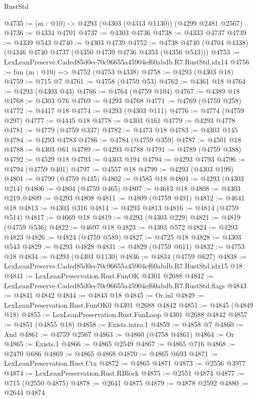 \begin{lexlean}{RustStd}
\begin{coremodule}
@4735 := (m : @10) -> @4293 (@4303 (@4313 @1130)) (@4299 @2481 @2567)
@4736 := @4334 @4701
@4737 := @4303 @4736
@4738 := @4333 @4737
@4739 := @4339 @543
@4740 := @4303 @4739
@4752 := @4738 @4740 (@4704 @4338) (@4346 @4740 @4737 (@4350 @4739 @4736 @4353 (@4356 @543)))
@4753 := LexLeanPreserve.Caded85d0ec70c96655a45904ef60abdb.R7.RustStd.idx14
@4756 := fun (m : @10) => @4752 (@4753 @4338)
@4758 := @4293 (@4303 @18)
@4759 := @715 @7
@4761 := @4758 (@4759 @53)
@4762 := @4361 @18
@4764 := @4293 (@4303 @43)
@4766 := @4764 (@4759 @104)
@4767 := @4389 @18
@4768 := @4303 @76
@4769 := @4293 @4768
@4771 := @4769 (@4759 @258)
@4772 := @4417 @18
@4774 := @4293 (@4303 @111)
@4776 := @4774 (@4759 @297)
@4777 := @4445 @18
@4778 := @4303 @161
@4779 := @4293 @4778
@4781 := @4779 (@4759 @337)
@4782 := @4473 @18
@4783 := @4303 @145
@4784 := @4293 @4783
@4786 := @4784 (@4759 @359)
@4787 := @4501 @18
@4788 := @4303 @61
@4789 := @4293 @4788
@4791 := @4789 (@4759 @388)
@4792 := @4529 @18
@4793 := @4303 @194
@4794 := @4293 @4793
@4796 := @4794 (@4759 @401)
@4797 := @4557 @18
@4799 := @4293 (@4303 @199)
@4801 := @4799 (@4759 @445)
@4802 := @4585 @18
@4804 := @4293 (@4303 @214)
@4806 := @4804 (@4759 @465)
@4807 := @4613 @18
@4808 := @4303 @219
@4809 := @4293 @4808
@4811 := @4809 (@4759 @491)
@4812 := @4641 @18
@4813 := @4303 @316
@4814 := @4293 @4813
@4816 := @4814 (@4759 @514)
@4817 := @4669 @18
@4819 := @4293 (@4303 @229)
@4821 := @4819 (@4759 @536)
@4822 := @4697 @18
@4823 := @4303 @572
@4824 := @4293 @4823
@4826 := @4824 (@4759 @589)
@4827 := @4725 @18
@4828 := @4303 @543
@4829 := @4293 @4828
@4831 := @4829 (@4759 @611)
@4832 := @4753 @18
@4834 := @4293 (@4303 @1130)
@4836 := @4834 (@4759 @627)
@4838 := LexLeanPreserve.Caded85d0ec70c96655a45904ef60abdb.R7.RustStd.idx15 @18
@4841 := LexLeanPreservation.Rust.FunOK @4301 @2688
@4842 := LexLeanPreserve.Caded85d0ec70c96655a45904ef60abdb.R7.RustStd.flags
@4843 := @4841 @4842
@4844 := @4843 @18
@4845 := Or.inl
@4849 := LexLeanPreservation.Rust.FunOK0 @4301 @2688 @4842
@4851 := @4845 (@4849 @18)
@4855 := LexLeanPreservation.Rust.FunLoop @4301 @2688 @4842
@4857 := @4851 (@4855 @18)
@4858 := Exists.intro.{1}
@4859 := @4858 @7
@4860 := And
@4861 := @4759 @2567
@4863 := @4860 (@4758 @4861)
@4864 := Or
@4865 := Exists.{1}
@4866 := @4865 @2549
@4867 := @4865 @716
@4868 := @2470 @686
@4869 := @4865 @4868
@4870 := @4865 @693
@4871 := LexLeanPreservation.Rust.Ctx
@4872 := @4865 @4871
@4873 := @2556 @3977
@4874 := LexLeanPreservation.Rust.RBlock
@4875 := @2551 @4874
@4877 := @715 (@2550 @4875)
@4878 := @2641 @4875
@4879 := @4878 @2592
@4880 := @2644 @4874

\end{coremodule}
\end{lexlean}
